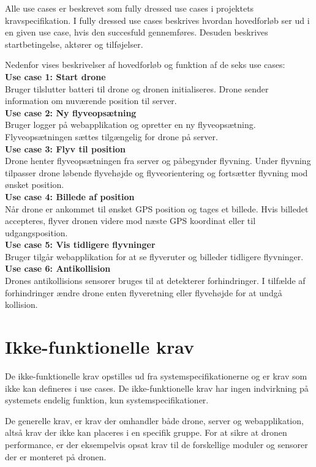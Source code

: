 Alle use cases er beskrevet som fully dressed use cases i projektets kravspecifikation. 
I fully dressed use cases beskrives hvordan hovedforløb ser ud i en given use case, hvis den succesfuld gennemføres. Desuden beskrives startbetingelse, aktører og tilføjelser.

Nedenfor vises beskrivelser af hovedforløb og funktion af de seks use cases:\\

\textbf{Use case 1: Start drone} \\
Bruger tilslutter batteri til drone og dronen initialiseres. Drone sender information om nuværende position til server.\\

\textbf{Use case 2: Ny flyveopsætning} \\
Bruger logger på webapplikation og opretter en ny flyveopsætning. Flyveopsætningen sættes tilgængelig for drone på server.\\

\textbf{Use case 3: Flyv til position}\\
Drone henter flyveopsætningen fra server og påbegynder flyvning. Under flyvning tilpasser drone  løbende flyvehøjde og flyveorientering og fortsætter flyvning mod ønsket position. \\

\textbf{Use case 4: Billede af position} \\
Når drone er ankommet til ønsket GPS position og tages et billede. Hvis billedet accepteres, flyver dronen videre mod næste GPS koordinat eller til udgangsposition. \\

\textbf{Use case 5: Vis tidligere flyvninger} \\
Bruger tilgår webapplikation for at se flyveruter og billeder tidligere flyvninger.\\

\textbf{Use case 6: Antikollision} \\
Drones antikollisions sensorer bruges til at detekterer forhindringer. I tilfælde af forhindringer ændre drone enten flyveretning eller flyvehøjde for at undgå kollision. \\



\section{Ikke-funktionelle krav}

De ikke-funktionelle krav opstilles ud fra systemspecifikationerne og er krav som ikke kan defineres i use cases. De ikke-funktionelle krav har ingen indvirkning på systemets endelig funktion, kun systemspecifikationer.  

De generelle krav, er krav der omhandler både drone, server og webapplikation, altså krav der ikke kan placeres i en specifik gruppe. For at sikre at dronen performance, er der eksempelvis opsat krav til de forskellige moduler og sensorer der er monteret på dronen. 

